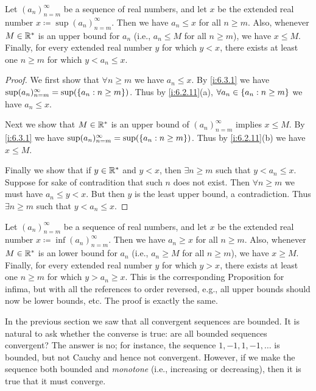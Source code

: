 \setcounter{thm}{5}
\begin{prop}\label{i:6.3.6}
  Let \((a_n)_{n = m}^\infty\) be a sequence of real numbers, and let \(x\) be the extended real number \(x \coloneqq \sup(a_n)_{n = m}^\infty\).
  Then we have \(a_n \leq x\) for all \(n \geq m\).
  Also, whenever \(M \in \mathbb{R}^*\) is an upper bound for \(a_n\) (i.e., \(a_n \leq M\) for all \(n \geq m\)), we have \(x \leq M\).
  Finally, for every extended real number \(y\) for which \(y < x\), there exists at least one \(n \geq m\) for which \(y < a_n \leq x\).
\end{prop}

\begin{proof}
  We first show that \(\forall n \geq m\) we have \(a_n \leq x\).
  By \cref{i:6.3.1} we have \(\sup(a_n)_{n = m}^\infty = \sup(\left\lbrace a_n : n \geq m\right\rbrace)\).
  Thus by \cref{i:6.2.11}(a), \(\forall a_n \in \left\lbrace a_n : n \geq m\right\rbrace\) we have \(a_n \leq x\).

  Next we show that \(M \in \mathbb{R}^*\) is an upper bound of \((a_n)_{n = m}^\infty\) implies \(x \leq M\).
  By \cref{i:6.3.1} we have \(\sup(a_n)_{n = m}^\infty = \sup(\left\lbrace a_n : n \geq m\right\rbrace)\).
  Thus by \cref{i:6.2.11}(b) we have \(x \leq M\).

  Finally we show that if \(y \in \mathbb{R}^*\) and \(y < x\), then \(\exists n \geq m\) such that \(y < a_n \leq x\).
  Suppose for sake of contradition that such \(n\) does not exist.
  Then \(\forall n \geq m\) we must have \(a_n \leq y < x\).
  But then \(y\) is the least upper bound, a contradiction.
  Thus \(\exists n \geq m\) such that \(y < a_n \leq x\).
\end{proof}

\begin{rmk}\label{i:6.3.7}
  Let \((a_n)_{n = m}^\infty\) be a sequence of real numbers, and let \(x\) be the extended real number \(x \coloneqq \inf(a_n)_{n = m}^\infty\).
  Then we have \(a_n \geq x\) for all \(n \geq m\).
  Also, whenever \(M \in \mathbb{R}^*\) is an lower bound for \(a_n\) (i.e., \(a_n \geq M\) for all \(n \geq m\)), we have \(x \geq M\).
  Finally, for every extended real number \(y\) for which \(y > x\), there exists at least one \(n \geq m\) for which \(y > a_n \geq x\).
  This is the corresponding Proposition for infima, but with all the references to order reversed, e.g., all upper bounds should now be lower bounds, etc.
  The proof is exactly the same.
\end{rmk}

\begin{note}
  In the previous section we saw that all convergent sequences are bounded.
  It is natural to ask whether the converse is true:
  are all bounded sequences convergent?
  The answer is no;
  for instance, the sequence \(1, -1, 1, -1, \dots\) is bounded, but not Cauchy and hence not convergent.
  However, if we make the sequence both bounded and \emph{monotone} (i.e., increasing or decreasing), then it is true that it must converge.
\end{note}

